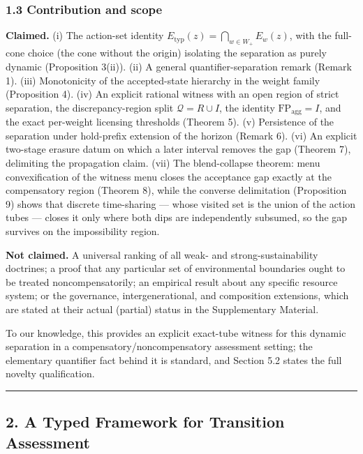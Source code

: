 \documentclass[11pt]{article}
\begin{document}
\subsubsection{1.3 Contribution and scope}\label{contribution-and-scope}

\textbf{Claimed.} (i) The action-set identity
\(E_{\mathrm{typ}}(z) = \bigcap_{w \in W_+} E_w(z)\), with the full-cone
choice (the cone without the origin) isolating the separation as purely
dynamic (Proposition 3(ii)). (ii) A general quantifier-separation remark
(Remark 1). (iii) Monotonicity of the accepted-state hierarchy in the
weight family (Proposition 4). (iv) An explicit rational witness with an
open region of strict separation, the discrepancy-region split
\(\mathcal{Q} = R \cup I\), the identity
\(\mathrm{FP}_{\mathrm{agg}} = I\), and the exact per-weight licensing
thresholds (Theorem 5). (v) Persistence of the separation under
hold-prefix extension of the horizon (Remark 6). (vi) An explicit
two-stage erasure datum on which a later interval removes the gap
(Theorem 7), delimiting the propagation claim. (vii) The blend-collapse
theorem: menu convexification of the witness menu closes the acceptance
gap exactly at the compensatory region (Theorem 8), while the converse
delimitation (Proposition 9) shows that discrete time-sharing --- whose
visited set is the union of the action tubes --- closes it only where
both dips are independently subsumed, so the gap survives on the
impossibility region.

\textbf{Not claimed.} A universal ranking of all weak- and
strong-sustainability doctrines; a proof that any particular set of
environmental boundaries ought to be treated noncompensatorily; an
empirical result about any specific resource system; or the governance,
intergenerational, and composition extensions, which are stated at their
actual (partial) status in the Supplementary Material.

To our knowledge, this provides an explicit exact-tube witness for this
dynamic separation in a compensatory/noncompensatory assessment setting;
the elementary quantifier fact behind it is standard, and Section 5.2
states the full novelty qualification.

\begin{center}\rule{0.5\linewidth}{0.5pt}\end{center}

\subsection{2. A Typed Framework for Transition
Assessment}\label{a-typed-framework-for-transition-assessment}
\end{document}
